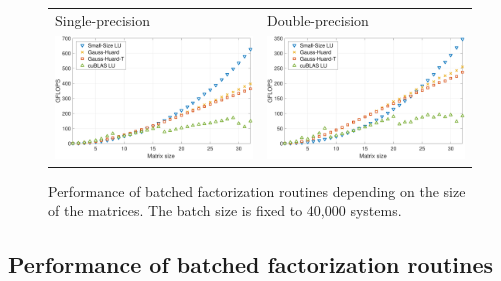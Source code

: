 \begin{figure}
\begin{center}
\begin{tabular}{ll}
\hline
Single-precision & Double-precision\\
\includegraphics[width=.45\columnwidth]{plots/incsize_single.pdf}
&
\includegraphics[width=.45\columnwidth]{plots/incsize_double.pdf}\\
\end{tabular}
\end{center}
\caption{%
Performance of batched factorization routines depending on the size of the matrices.
The batch size is fixed to 40,000 systems.
}
\label{2017-lu-block-jacobi:fig:performanceincsize}
\end{figure}

\subsection{Performance of batched factorization routines}

